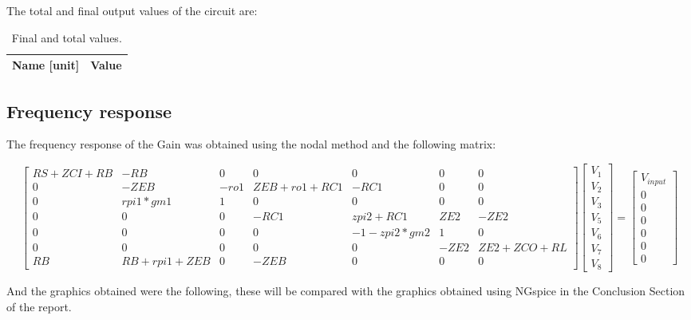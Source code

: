 The total and final output values of the circuit are:\par

\begin{table}[H]
	\centering
	\begin{tabular}{|l|r|}
		\hline    
		{\bf Name [unit]} & {\bf Value} \\ \hline
		
	\end{tabular}
	\caption{Final and total values.}
	\label{tab:teo}
\end{table}

\subsection{Frequency response}

The frequency response of the Gain was obtained using the nodal method and the following matrix:

\begin{equation}
\begin{bmatrix}
RS+ZCI+RB & -RB& 0& 0& 0& 0& 0 \\ 
0 & -ZEB & -ro1 & ZEB+ro1+RC1 & -RC1&  0& 0\\ 
0 & rpi1*gm1 & 1 & 0 & 0 &  0& 0\\ 
0 & 0 & 0 & -RC1 & zpi2+RC1 & ZE2 & -ZE2 \\ 
0 & 0 &0  & 0 & -1-zpi2*gm2  & 1 & 0 \\
0 & 0 &0  & 0 & 0 & -ZE2 & ZE2+ZCO+RL\\ 
RB & RB+rpi1+ZEB & 0 & -ZEB & 0 & 0 & 0
\end{bmatrix}
\begin{bmatrix}
V_{1}\\ 
V_{2}\\ 
V_{3}\\ 
V_{5}\\ 
V_{6}\\ 
V_{7}\\ 
V_{8}
\end{bmatrix}
=
\begin{bmatrix}
V_{input}\\ 
0\\ 
0\\ 
0\\ 
0\\ 
0\\ 
0
\end{bmatrix}
\end{equation}


And the graphics obtained were the following, these will be compared with the graphics obtained using NGspice in the Conclusion Section of the report.

